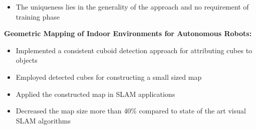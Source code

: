 \documentclass[10pt,a4paper,sans]{moderncv}        %
\begin{document}
{\begin{itemize}
\item The uniqueness lies in the generality of the approach and no requirement of training phase 
\end{itemize}
\textbf{Geometric Mapping of Indoor Environments for Autonomous Robots:}
\begin{itemize}
\item Implemented a consistent cuboid detection approach for attributing cubes to objects
\item Employed detected cubes for constructing a small sized map%
\item Applied the constructed map in SLAM applications
\item Decreased the map size more than 40\% compared to state of the art visual SLAM algorithms
\end{itemize}}
\end{document}
